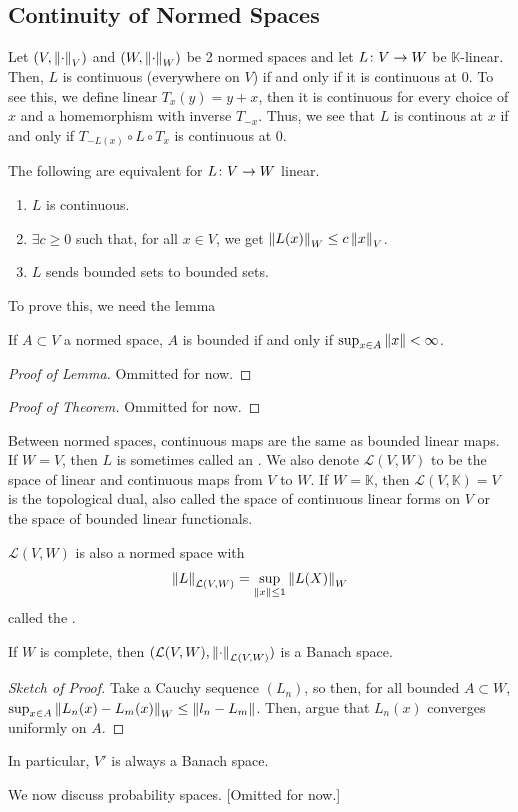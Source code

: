 \documentclass[11pt,leqno,oneside]{amsbook}
\numberwithin{thm}{section}
\newcommand{\cL}{\mathcal{L}}
\newcommand{\K}{\mathbb{K}} %
\begin{document}
  \subsection{Continuity of Normed Spaces}
  \begin{rmk}
    Let \((V,\norm_V)\) and \((W,\norm_W)\) be 2 normed spaces and let
    \(L \from V \to W\) be \(\K\)-linear. Then, \(L\) is continuous
    (everywhere on \(V\)) if and only if it is continuous at
    0. To see this, we define linear \(T_x(y) = y+x\), then it is
    continuous for every choice of \(x\) and a homemorphism with
    inverse \(T_{-x}\). Thus, we see that \(L\) is continous at \(x\)
    if and only if \(T_{-L(x)} \circ L \circ T_x\) is continuous at
    \(0\).
  \end{rmk}
  \begin{prop}
    The following are equivalent for \(L \from V \to W\) linear.
    \begin{enumerate}
    \item \(L\) is continuous.
    \item \(\exists c \geq 0\) such that, for all \(x \in V\), we get
      \(\norm[L(x)]_W \leq c \norm[x]_V\).
    \item \(L\) sends bounded sets to bounded sets.
    \end{enumerate}
  \end{prop}
  To prove this, we need the lemma
  \begin{lem}
    If \(A \subset V\) a normed space, \(A\) is bounded if and only if
    \(\sup_{x \in A} \norm[x] < \infty\).
  \end{lem}
  \begin{proof}[Proof of Lemma]
    Ommitted for now.
  \end{proof}
  \begin{proof}[Proof of Theorem]
    Ommitted for now.
  \end{proof}
  Between normed spaces, continuous maps are the same as bounded
  linear maps. If \(W = V\), then \(L\) is sometimes called an
  . We also denote \(\cL(V,W)\) to be the space of linear
  and continuous maps from \(V\) to \(W\). If \(W = \K\), then
  \(\cL(V,\K)=V\) is the topological dual, also called the space of
  continuous linear forms on \(V\) or the space of bounded linear
  functionals.
  \begin{prop}
    \(\cL(V,W)\) is also a normed space with \[
      \norm[L]_{\cL(V,W)} = \sup_{\norm[x] \leq 1} \norm[L(X)]_W
    \]
    called the .
  \end{prop}
  \begin{thm}
    If \(W\) is complete, then \((\cL(V,W),\norm_{\cL(V,W)})\) is a
    Banach space.
  \end{thm}
  \begin{proof}[Sketch of Proof]
    Take a Cauchy sequence \((L_n)\), so then, for all bounded \(A
    \subset W\), \(\sup_{x \in A} \norm[L_n(x) - L_m(x)]_W \leq
    \norm[l_n - L_m]\). Then, argue that \(L_n(x)\) converges
    uniformly on \(A\).
  \end{proof}
  In particular, \(V'\) is always a Banach space.
  \begin{example}
    We now discuss probability spaces. [Omitted for now.]
  \end{example}
\end{document}
